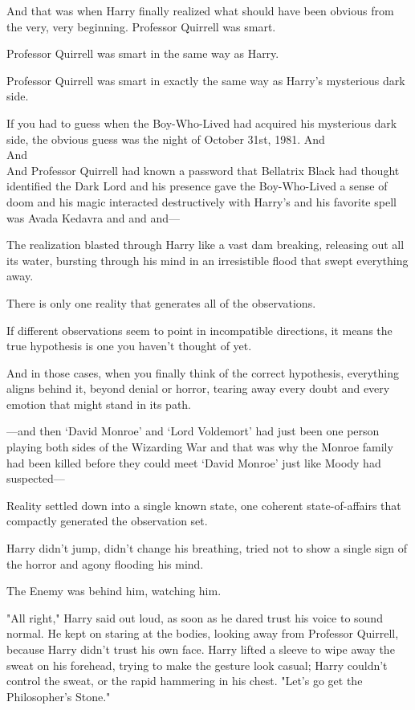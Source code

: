 And that was when Harry finally realized what should have been obvious from the 
very, very beginning.
\sbreak
Professor Quirrell was smart.

Professor Quirrell was smart in the same way as Harry.

Professor Quirrell was smart in exactly the same way as Harry's mysterious dark 
side.

If you had to guess when the Boy-Who-Lived had acquired his mysterious dark 
side, the obvious guess was the night of October 31st, 1981.
\sbreak
And\\
And\\
And Professor Quirrell had known a password that Bellatrix Black had thought 
identified the Dark Lord and his presence gave the Boy-Who-Lived a sense of 
doom and his magic interacted destructively with Harry's and his favorite spell 
was Avada Kedavra and and and---

The realization blasted through Harry like a vast dam breaking, releasing out 
all its water, bursting through his mind in an irresistible flood that swept 
everything away.

There is only one reality that generates all of the observations.

If different observations seem to point in incompatible directions, it means 
the true hypothesis is one you haven't thought of yet.

And in those cases, when you finally think of the correct hypothesis, 
everything aligns behind it, beyond denial or horror, tearing away every doubt 
and every emotion that might stand in its path.

---and then `David Monroe' and `Lord Voldemort' had just been one person 
playing both sides of the Wizarding War and that was why the Monroe family had 
been killed before they could meet `David Monroe' just like Moody had 
suspected---

Reality settled down into a single known state, one coherent state-of-affairs 
that compactly generated the observation set.

Harry didn't jump, didn't change his breathing, tried not to show a single sign 
of the horror and agony flooding his mind.

The Enemy was behind him, watching him.

"All right," Harry said out loud, as soon as he dared trust his voice to sound 
normal. He kept on staring at the bodies, looking away from Professor Quirrell, 
because Harry didn't trust his own face. Harry lifted a sleeve to wipe away the 
sweat on his forehead, trying to make the gesture look casual; Harry couldn't 
control the sweat, or the rapid hammering in his chest. "Let's go get the 
Philosopher's Stone."

